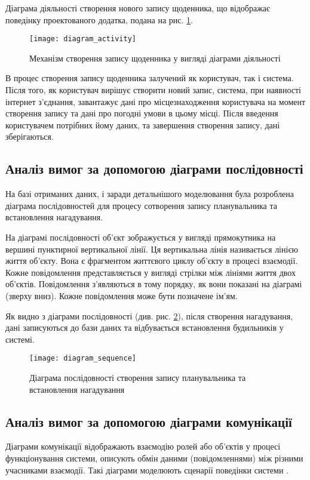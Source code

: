 \documentclass[../main.tex]{subfiles}
\begin{document}
Діаграма діяльності створення нового запису щоденника, що відображає поведінку проектованого додатка, подана на рис. \ref{diagram:activity}.

\begin{figure}[H]
	\centering
	\texttt{[image: diagram\_activity]}
	\caption{Механізм створення запису щоденника у вигляді діаграми діяльності}
	\label{diagram:activity}
\end{figure}

В процес створення запису щоденника залучений як користувач, так і система. Після того, як користувач вирішує створити новий запис, система, при наявності інтернет з'єднання, завантажує дані про місцезнаходження користувача на момент створення запису та дані про погодні умови в цьому місці. Після введення користувачем потрібних йому даних, та завершення створення запису, дані зберігаються.

\subsection{Аналіз вимог за допомогою діаграми послідовності}
На базі отриманих даних, і заради детальнішого моделювання була розроблена діаграма послідовностей для процесу сотворення запису планувальника та встановлення нагадування.

На діаграмі послідовності об’єкт зображується у вигляді прямокутника на вершині пунктирної вертикальної лінії. Ця вертикальна лінія називається лінією життя об’єкту. Вона є фрагментом життєвого циклу об’єкту в процесі взаємодії. Кожне повідомлення представляється у вигляді стрілки між лініями життя двох об’єктів. Повідомлення з’являються в тому порядку, як вони показані на діаграмі (зверху вниз). Кожне повідомлення може бути позначене ім’ям.

Як видно з діаграми послідовності (див. рис. \ref{diagram:sequence}), після створення нагадування, дані записуються до бази даних та відбувається встановлення будильників у системі. 

\begin{figure}[H]
	\centering
	\texttt{[image: diagram\_sequence]}
	\caption{Діаграма послідовності створення запису планувальника та встановлення нагадування}
	\label{diagram:sequence}
\end{figure}

\subsection{Аналіз вимог за допомогою діаграми комунікації}
Діаграми комунікації відображають взаємодію ролей або об'єктів у процесі функціонування системи, описують обмін даними (повідомленнями) між різними учасниками взаємодії. Такі діаграми моделюють сценарії поведінки системи \cite{diploma_guidelines}. 
\end{document}
